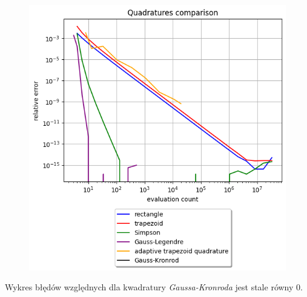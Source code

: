 \documentclass{article}
\begin{document}
\begin{figure}[H]
  \includegraphics[width=\linewidth]{figures/quad_f.png}
\end{figure}
Wykres błędów względnych dla kwadratury \textit{Gaussa-Kronroda}
jest stale równy 0.
\\\\
\null\quad
\end{document}
